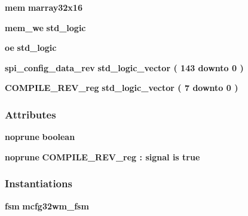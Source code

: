 \begin{DoxyCompactItemize}
{\bf mem} {\bfseries {\bfseries {\bf marray32x16}} \textcolor{vhdlchar}{ }} 
\item 
{\bf mem\+\_\+we} {\bfseries \textcolor{comment}{std\+\_\+logic}\textcolor{vhdlchar}{ }} 
\item 
{\bf oe} {\bfseries \textcolor{comment}{std\+\_\+logic}\textcolor{vhdlchar}{ }} 
\item 
{\bf spi\+\_\+config\+\_\+data\+\_\+rev} {\bfseries \textcolor{comment}{std\+\_\+logic\+\_\+vector}\textcolor{vhdlchar}{ }\textcolor{vhdlchar}{(}\textcolor{vhdlchar}{ }\textcolor{vhdlchar}{ } \textcolor{vhdldigit}{143} \textcolor{vhdlchar}{ }\textcolor{keywordflow}{downto}\textcolor{vhdlchar}{ }\textcolor{vhdlchar}{ } \textcolor{vhdldigit}{0} \textcolor{vhdlchar}{ }\textcolor{vhdlchar}{)}\textcolor{vhdlchar}{ }} 
\item 
{\bf C\+O\+M\+P\+I\+L\+E\+\_\+\+R\+E\+V\+\_\+reg} {\bfseries \textcolor{comment}{std\+\_\+logic\+\_\+vector}\textcolor{vhdlchar}{ }\textcolor{vhdlchar}{(}\textcolor{vhdlchar}{ }\textcolor{vhdlchar}{ } \textcolor{vhdldigit}{7} \textcolor{vhdlchar}{ }\textcolor{keywordflow}{downto}\textcolor{vhdlchar}{ }\textcolor{vhdlchar}{ } \textcolor{vhdldigit}{0} \textcolor{vhdlchar}{ }\textcolor{vhdlchar}{)}\textcolor{vhdlchar}{ }} 
\end{DoxyCompactItemize}
\subsubsection*{Attributes}
 \begin{DoxyCompactItemize}
\item 
{\bf noprune} {\bfseries \textcolor{comment}{boolean}\textcolor{vhdlchar}{ }} 
\item 
{\bf noprune} {\bfseries {\bfseries {\bf C\+O\+M\+P\+I\+L\+E\+\_\+\+R\+E\+V\+\_\+reg}} \textcolor{vhdlchar}{ }\textcolor{vhdlchar}{\+:}\textcolor{vhdlchar}{ }\textcolor{keywordflow}{signal}\textcolor{vhdlchar}{ }\textcolor{keywordflow}{is}\textcolor{vhdlchar}{ }\textcolor{vhdlchar}{ }\textcolor{vhdlchar}{ }\textcolor{vhdlchar}{ }\textcolor{vhdlchar}{true}\textcolor{vhdlchar}{ }} 
\end{DoxyCompactItemize}
\subsubsection*{Instantiations}
 \begin{DoxyCompactItemize}
\item 
{\bf fsm}  {\bfseries mcfg32wm\+\_\+fsm}   
\end{DoxyCompactItemize}



